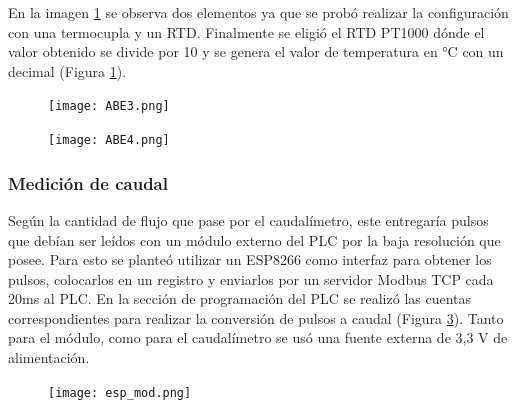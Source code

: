 En la imagen \ref{fig:ABE3} se observa dos elementos ya que se probó realizar la configuración con una termocupla y un RTD. Finalmente se eligió el RTD PT1000 dónde el valor obtenido se divide por 10 y se genera el valor de temperatura en °C con un decimal  (Figura \ref{fig:ABE3}).

\begin{figure}[H]
	\centering
	\texttt{[image: ABE3.png]}
	\label{fig:ABE3}
\end{figure}

\begin{figure}[H]
	\centering
	\texttt{[image: ABE4.png]}
	\label{fig:ABE4}
\end{figure}

\subsubsection{Medición de caudal}
Según la cantidad de flujo que pase por el caudalímetro, este entregaría pulsos que debían ser leídos con un módulo externo del PLC por la baja resolución que posee. Para esto se planteó utilizar un ESP8266 como interfaz para obtener los pulsos, colocarlos en un registro y enviarlos por un servidor Modbus TCP cada 20ms al PLC. En la sección de programación del PLC se realizó las cuentas correspondientes para realizar la conversión de pulsos a caudal (Figura \ref{fig:modtcp}). Tanto para el módulo, como para el caudalímetro se usó una fuente externa de 3,3 V de alimentación.
\begin{figure}[htbp]
	\centering
	\texttt{[image: esp\_mod.png]}
	\label{fig:modtcp}
\end{figure}
\newpage

